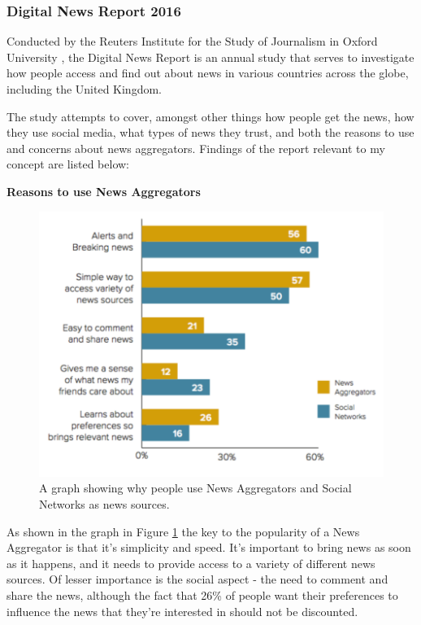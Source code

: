\documentclass[12pt]{article}
\begin{document}
\subsubsection{Digital News Report 2016}

\label{DigitalNewsReport}

Conducted by the Reuters Institute for the Study of Journalism \cite{reutersInstitute} in Oxford University \cite{oxford}, the Digital News Report \cite{digitalNewsReport} is an annual study that serves to investigate how people access and find out about news in various countries across the globe, including the United Kingdom.

The study attempts to cover, amongst other things how people get the news, how they use social media, what types of news they trust, and both the reasons to use and concerns about news aggregators. Findings of the report relevant to my concept are listed below:

\textbf{Reasons to use News Aggregators}

\begin{figure}[h]
  \centering
    \includegraphics[scale=0.6]{WhySocialAggregatedNews.png}
   \caption[Why people use News Aggregators]{A graph showing why people use News Aggregators and Social Networks as news sources.}
   \label{WhySocialAggregatedNews}
\end{figure}

As shown in the graph in Figure \ref{WhySocialAggregatedNews} the key to the popularity of a News Aggregator is that it's simplicity and speed. It's important to bring news as soon as it happens, and it needs to provide access to a variety of different news sources. Of lesser importance is the social aspect - the need to comment and share the news, although the fact that 26\% of people want their preferences to influence the news that they're interested in should not be discounted.
\end{document}
